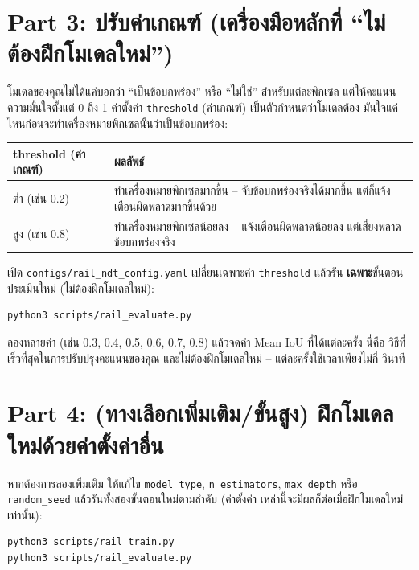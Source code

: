 \documentclass[11pt]{article}
\begin{document}
\section*{Part 3: ปรับค่าเกณฑ์ (เครื่องมือหลักที่ ``ไม่ต้องฝึกโมเดลใหม่'')}
โมเดลของคุณไม่ได้แค่บอกว่า ``เป็นข้อบกพร่อง'' หรือ ``ไม่ใช่'' สำหรับแต่ละพิกเซล แต่ให้คะแนน
ความมั่นใจตั้งแต่ 0 ถึง 1 ค่าตั้งค่า \texttt{threshold} (ค่าเกณฑ์) เป็นตัวกำหนดว่าโมเดลต้อง
มั่นใจแค่ไหนก่อนจะทำเครื่องหมายพิกเซลนั้นว่าเป็นข้อบกพร่อง:

\begin{center}
\begin{tabular}{@{}lp{9.5cm}@{}}
\toprule
\textbf{threshold (ค่าเกณฑ์)} & \textbf{ผลลัพธ์} \\
\midrule
ต่ำ (เช่น 0.2)  & ทำเครื่องหมายพิกเซลมากขึ้น -- จับข้อบกพร่องจริงได้มากขึ้น แต่ก็แจ้งเตือนผิดพลาดมากขึ้นด้วย \\
สูง (เช่น 0.8) & ทำเครื่องหมายพิกเซลน้อยลง -- แจ้งเตือนผิดพลาดน้อยลง แต่เสี่ยงพลาดข้อบกพร่องจริง \\
\bottomrule
\end{tabular}
\end{center}

เปิด \texttt{configs/rail\_ndt\_config.yaml} เปลี่ยนเฉพาะค่า \texttt{threshold} แล้วรัน
\textbf{เฉพาะ}ขั้นตอนประเมินใหม่ (ไม่ต้องฝึกโมเดลใหม่):

\begin{lstlisting}
python3 scripts/rail_evaluate.py
\end{lstlisting}

\begin{tipbox}
ลองหลายค่า (เช่น 0.3, 0.4, 0.5, 0.6, 0.7, 0.8) แล้วจดค่า Mean IoU ที่ได้แต่ละครั้ง นี่คือ
วิธีที่เร็วที่สุดในการปรับปรุงคะแนนของคุณ และไม่ต้องฝึกโมเดลใหม่ -- แต่ละครั้งใช้เวลาเพียงไม่กี่
วินาที
\end{tipbox}

\section*{Part 4: (ทางเลือกเพิ่มเติม/ขั้นสูง) ฝึกโมเดลใหม่ด้วยค่าตั้งค่าอื่น}
หากต้องการลองเพิ่มเติม ให้แก้ไข \texttt{model\_type}, \texttt{n\_estimators},
\texttt{max\_depth} หรือ \texttt{random\_seed} แล้วรันทั้งสองขั้นตอนใหม่ตามลำดับ (ค่าตั้งค่า
เหล่านี้จะมีผลก็ต่อเมื่อฝึกโมเดลใหม่เท่านั้น):

\begin{lstlisting}
python3 scripts/rail_train.py
python3 scripts/rail_evaluate.py
\end{lstlisting}
\end{document}
